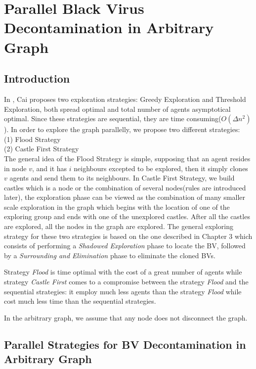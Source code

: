 \chapter {Parallel Black Virus Decontamination in Arbitrary Graph}
\label{TL}

\section{Introduction}
In \cite{cai}, Cai proposes two exploration strategies: Greedy Exploration and Threshold Exploration, both spread optimal and total number of agents asymptotical optimal. Since these strategies are sequential, they are time consuming($O(\Delta n^2)$).  In order to explore the graph parallelly, we propose two different strategies: \\
(1) Flood Strategy\\
(2) Castle First Strategy\\
The general idea of the Flood Strategy is simple, supposing that an agent resides in node $v$, and it has $i$ neighbours excepted to be explored, then it simply clones $v$ agents and send them to its neighbours. In Castle First Strategy, we build castles which is a node or the combination of several nodes(rules are introduced later), the exploration phase can be viewed as the combination of many smaller scale exploration in the graph which begins with the location of one of the exploring group and ends with one of the unexplored castles. After all the castles are explored, all the nodes in the graph are explored. The general exploring strategy for these two strategies is based on the one described in Chapter 3 which consists of performing a {\em Shadowed Exploration} phase to locate the BV, followed by a {\em Surrounding and Elimination} phase to eliminate the cloned BVs. 

Strategy {\em Flood}  is time optimal with the cost of a great number of agents while strategy {\em Castle First} comes to a compromise between the strategy {\em Flood} and the sequential strategies: it employ much less agents than the strategy {\em Flood} while cost much less time than the sequential strategies. 

In the arbitrary graph, we assume that any node does not disconnect the graph.

\section{Parallel Strategies for BV Decontamination in Arbitrary Graph}
